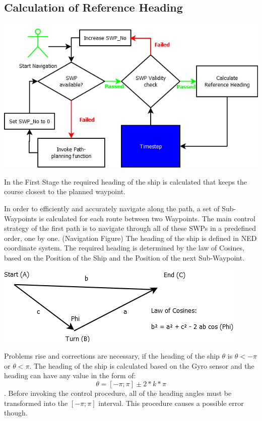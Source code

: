 \subsection{Calculation of Reference Heading}

\includegraphics[width=\textwidth]{img/ControlStrategyFigures/Navigation.png}

In the First Stage the required heading of the ship is calculated that keeps the course closest to the planned waypoint.

In order to efficiently and accurately navigate along the path, a set of Sub-Waypoints is calculated for each route between two Waypoints. The main control strategy of the first path is to navigate through all of these SWPs in a predefined order, one by one. (Navigation Figure) The heading of the ship is defined in NED coordinate system. The required heading is determined by the law of Cosines, based on the Position of the Ship and the Position of the next Sub-Waypoint.
\begin{center}
\includegraphics[scale = 0.4]{img/ControlStrategyFigures/Law_of_Cosines.png}
\end{center}
Problems rise and corrections are necessary, if the heading of the ship $\theta$ is $\theta < -\pi$ or $\theta < \pi$. The heading of the ship is calculated based on the Gyro sensor and the heading can have any value in the form of: $$\theta = [-{\pi} ; \pi ] \pm 2*k*\pi$$. Before invoking the control procedure, all of the heading angles must be transformed into the $[-\pi ; \pi]$ interval.
This procedure causes a possible error though.


